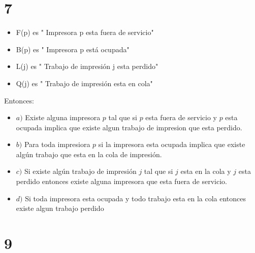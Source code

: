 \documentclass[12pt, fleqn]{article}                            %
\theoremstyle{break}                                            %
\begin{document}
\clearpage
\section{7}

    \begin{itemize}
        \item F(p) es " Impresora p esta fuera de servicio"
        \item B(p) es " Impresora p está ocupada"
        \item L(j) es " Trabajo de impresión j esta perdido"
        \item Q(j) es " Trabajo de impresión esta en cola"
    \end{itemize}

    Entonces:
    \begin{itemize}
        
        \item $a)$
            Existe alguna impresora $p$ tal que si $p$ esta fuera de servicio
            y $p$ esta ocupada implica que existe algun trabajo de impresion
            que esta perdido.

        \item $b)$
            Para toda impresiora $p$ si la impresora esta ocupada implica
            que existe algún trabajo que esta en la cola de impresión.

        \item $c)$
            Si existe algún trabajo de impresión $j$ tal que si $j$ esta
            en la cola y $j$ esta perdido entonces existe alguna impresora
            que esta fuera de servicio.

        \item $d)$
            Si toda impresora esta ocupada y todo trabajo esta en la cola
            entonces existe algun trabajo perdido

    \end{itemize}


\clearpage
\section{9}
\end{document}
